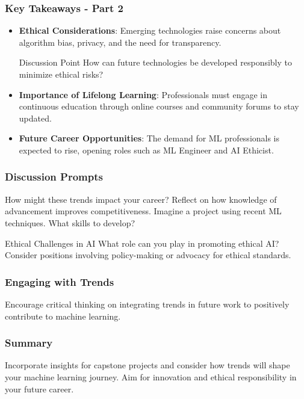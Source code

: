 \documentclass[aspectratio=169]{beamer}
\begin{document}
\begin{frame}[fragile]
    \frametitle{Key Takeaways - Part 2}
    \begin{itemize}
        \item \textbf{Ethical Considerations}:
        Emerging technologies raise concerns about algorithm bias, privacy, and the need for transparency.
        \begin{block}{Discussion Point}
            How can future technologies be developed responsibly to minimize ethical risks?
        \end{block}
        
        \item \textbf{Importance of Lifelong Learning}:
        Professionals must engage in continuous education through online courses and community forums to stay updated.
        
        \item \textbf{Future Career Opportunities}:
        The demand for ML professionals is expected to rise, opening roles such as ML Engineer and AI Ethicist.
    \end{itemize}
\end{frame}

\begin{frame}[fragile]
    \frametitle{Discussion Prompts}
    \begin{block}{How might these trends impact your career?}
        Reflect on how knowledge of advancement improves competitiveness.
        Imagine a project using recent ML techniques. What skills to develop?
    \end{block}
    
    \begin{block}{Ethical Challenges in AI}
        What role can you play in promoting ethical AI?
        Consider positions involving policy-making or advocacy for ethical standards.
    \end{block}
\end{frame}

\begin{frame}[fragile]
    \frametitle{Engaging with Trends}
    Encourage critical thinking on integrating trends in future work to positively contribute to machine learning.
\end{frame}

\begin{frame}[fragile]
    \frametitle{Summary}
    Incorporate insights for capstone projects and consider how trends will shape your machine learning journey. Aim for innovation and ethical responsibility in your future career.
\end{frame}
\end{document}
